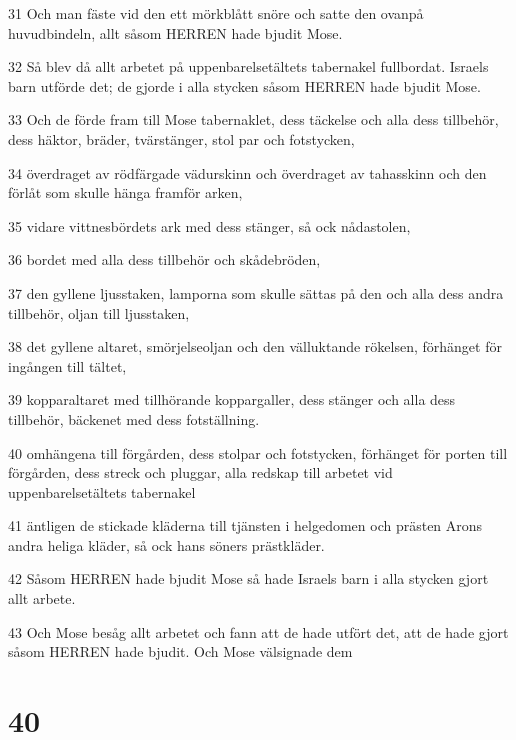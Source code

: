 \par 31 Och man fäste vid den ett mörkblått snöre och satte den ovanpå huvudbindeln, allt såsom HERREN hade bjudit Mose.
\par 32 Så blev då allt arbetet på uppenbarelsetältets tabernakel fullbordat. Israels barn utförde det; de gjorde i alla stycken såsom HERREN hade bjudit Mose.
\par 33 Och de förde fram till Mose tabernaklet, dess täckelse och alla dess tillbehör, dess häktor, bräder, tvärstänger, stol par och fotstycken,
\par 34 överdraget av rödfärgade vädurskinn och överdraget av tahasskinn och den förlåt som skulle hänga framför arken,
\par 35 vidare vittnesbördets ark med dess stänger, så ock nådastolen,
\par 36 bordet med alla dess tillbehör och skådebröden,
\par 37 den gyllene ljusstaken, lamporna som skulle sättas på den och alla dess andra tillbehör, oljan till ljusstaken,
\par 38 det gyllene altaret, smörjelseoljan och den välluktande rökelsen, förhänget för ingången till tältet,
\par 39 kopparaltaret med tillhörande koppargaller, dess stänger och alla dess tillbehör, bäckenet med dess fotställning.
\par 40 omhängena till förgården, dess stolpar och fotstycken, förhänget för porten till förgården, dess streck och pluggar, alla redskap till arbetet vid uppenbarelsetältets tabernakel
\par 41 äntligen de stickade kläderna till tjänsten i helgedomen och prästen Arons andra heliga kläder, så ock hans söners prästkläder.
\par 42 Såsom HERREN hade bjudit Mose så hade Israels barn i alla stycken gjort allt arbete.
\par 43 Och Mose besåg allt arbetet och fann att de hade utfört det, att de hade gjort såsom HERREN hade bjudit. Och Mose välsignade dem

\chapter{40}

